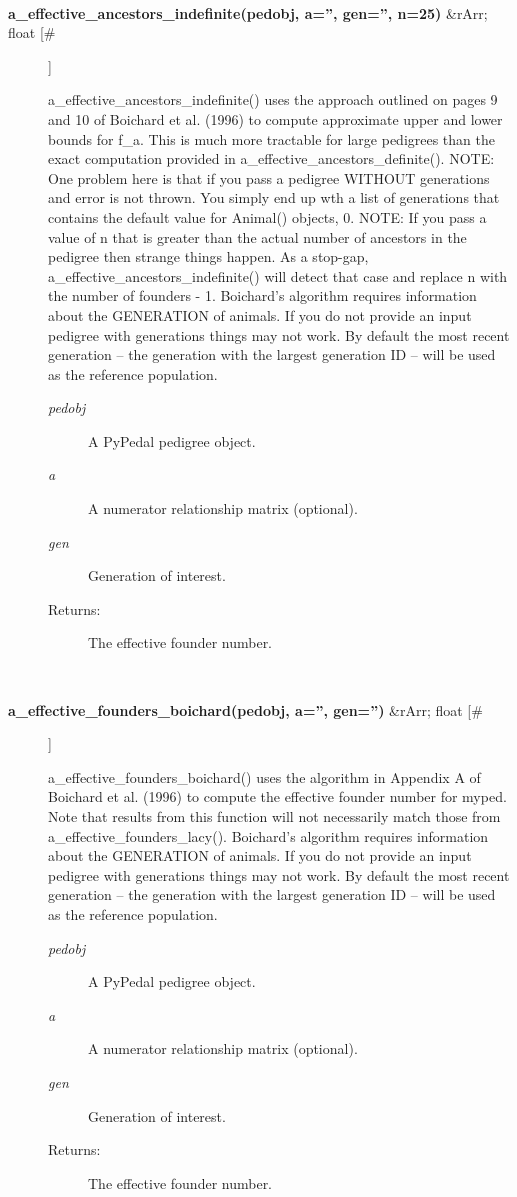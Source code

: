 \begin{description}
\begin{description}
\end{description}
\\ 

\item[\textbf{a\_effective\_ancestors\_indefinite(pedobj, a='', gen='', n=25)}
 \&rArr; float [\#]]

 a\_effective\_ancestors\_indefinite() uses the approach outlined on pages 9 and 10 of Boichard et al. (1996) to compute approximate upper and lower bounds for f\_a. This is much more tractable for large pedigrees than the exact computation provided in a\_effective\_ancestors\_definite(). NOTE: One problem here is that if you pass a pedigree WITHOUT generations and error is not thrown. You simply end up wth a list of generations that contains the default value for Animal() objects, 0. NOTE: If you pass a value of n that is greater than the actual number of ancestors in the pedigree then strange things happen. As a stop-gap, a\_effective\_ancestors\_indefinite() will detect that case and replace n with the number of founders - 1. Boichard's algorithm requires information about the GENERATION of animals. If you do not provide an input pedigree with generations things may not work. By default the most recent generation -- the generation with the largest generation ID -- will be used as the reference population.
\begin{description}
\item[\emph{pedobj}
] A PyPedal pedigree object.
\item[\emph{a}
] A numerator relationship matrix (optional).
\item[\emph{gen}
] Generation of interest.
\item[Returns:] The effective founder number.

\end{description}
\\ 

\item[\textbf{a\_effective\_founders\_boichard(pedobj, a='', gen='')}
 \&rArr; float [\#]]

 a\_effective\_founders\_boichard() uses the algorithm in Appendix A of Boichard et al. (1996) to compute the effective founder number for myped. Note that results from this function will not necessarily match those from a\_effective\_founders\_lacy(). Boichard's algorithm requires information about the GENERATION of animals. If you do not provide an input pedigree with generations things may not work. By default the most recent generation -- the generation with the largest generation ID -- will be used as the reference population.
\begin{description}
\item[\emph{pedobj}
] A PyPedal pedigree object.
\item[\emph{a}
] A numerator relationship matrix (optional).
\item[\emph{gen}
] Generation of interest.
\item[Returns:] The effective founder number.


\end{description}
\end{description}
